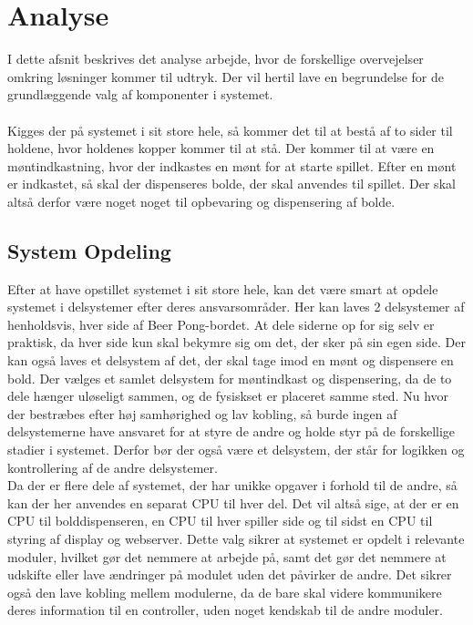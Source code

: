 \documentclass[Rapport/Rapport_main.tex]{subfiles}
\begin{document}
\section{Analyse}\label{sec:rapport_analyse}
I dette afsnit beskrives det analyse arbejde, hvor de forskellige overvejelser omkring løsninger kommer til udtryk. Der vil hertil lave en begrundelse for de grundlæggende valg af komponenter i systemet. \\\\
Kigges der på systemet i sit store hele, så kommer det til at bestå af to sider til holdene, hvor holdenes kopper kommer til at stå. Der kommer til at være en møntindkastning, hvor der indkastes en mønt for at starte spillet. Efter en mønt er indkastet, så skal der dispenseres bolde, der skal anvendes til spillet. Der skal altså derfor være noget noget til opbevaring og dispensering af bolde.\\ 
\subsection{System Opdeling}
Efter at have opstillet systemet i sit store hele, kan det være smart at opdele systemet i delsystemer efter deres ansvarsområder. Her kan laves 2 delsystemer af henholdsvis, hver side af Beer Pong-bordet. At dele siderne op for sig selv er praktisk, da hver side kun skal bekymre sig om det, der sker på sin egen side. Der kan også laves et delsystem af det, der skal tage imod en mønt og dispensere en bold. Der vælges et samlet delsystem for møntindkast og dispensering, da de to dele hænger uløseligt sammen, og de fysiskset er placeret samme sted. Nu hvor der bestræbes efter høj samhørighed og lav kobling, så burde ingen af delsystemerne have ansvaret for at styre de andre og holde styr på de forskellige stadier i systemet. Derfor bør der også være et delsystem, der står for logikken og kontrollering af de andre delsystemer.\\
Da der er flere dele af systemet, der har unikke opgaver i forhold til de andre, så kan der her anvendes en separat CPU til hver del. Det vil altså sige, at der er en CPU til bolddispenseren, en CPU til hver spiller side og til sidst en CPU til styring af display og webserver. Dette valg sikrer at systemet er opdelt i relevante moduler, hvilket gør det nemmere at arbejde på, samt det gør det nemmere at udskifte eller lave ændringer på modulet uden det påvirker de andre. Det sikrer også den lave kobling mellem modulerne, da de bare skal videre kommunikere deres information til en controller, uden noget kendskab til de andre moduler.
\end{document}
